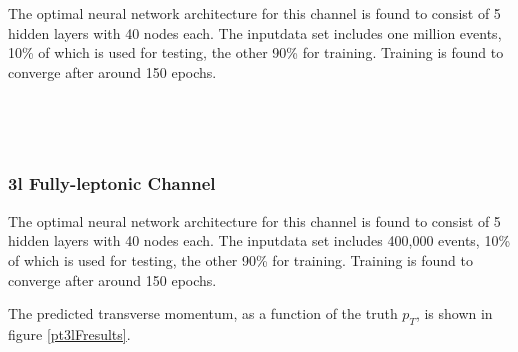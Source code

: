 

The optimal neural network architecture for this channel is found to consist of 5 hidden layers with 40 nodes each. The inputdata set includes one million events, 10\% of which is used for testing, the other 90\% for training. Training is found to converge after around 150 epochs.
                                                                                                                             
\begin{figure}[h!]
    \\                     
    \caption{}
    \label{fig:pt3lSresults}
\end{figure}

\begin{figure}[h!]                                                                                                           
    \\
    \caption{}
    \label{fig:pt3lSroc}
\end{figure}


\subsubsection{3l Fully-leptonic Channel}
\label{subsec:pt3lF}



The optimal neural network architecture for this channel is found to consist of 5 hidden layers with 40 nodes each. The inputdata set includes 400,000 events, 10\% of which is used for testing, the other 90\% for training. Training is found to converge after around 150 epochs.

The predicted transverse momentum, as a function of the truth $p_T$, is shown in figure \ref{pt3lFresults}.
                                                                                                                             
